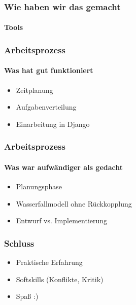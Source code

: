 \documentclass{beamer}
\begin{document}
\begin{frame}
\frametitle{Wie haben wir das gemacht}
\framesubtitle{Tools}

\end{frame}
\begin{frame}
\frametitle{Arbeitsprozess}
\framesubtitle{Was hat gut funktioniert}
\begin{itemize}
	\item<1-3> Zeitplanung
	\item<2-3> Aufgabenverteilung
	\item<3> Einarbeitung in Django
\end{itemize}
\end{frame}

\begin{frame}
\frametitle{Arbeitsprozess}
\framesubtitle{Was war aufwändiger als gedacht}
\begin{itemize}
	\item<1-3> Planungsphase
	\item<2-3> Wasserfallmodell ohne Rückkopplung
	\item<3> Entwurf vs. Implementierung
\end{itemize}
\end{frame}

\begin{frame}
\frametitle{Schluss}
	
\begin{center}
\begin{itemize}
	\item<1-3> Praktische Erfahrung
	\item<2-3> Softskills (Konflikte, Kritik)
	\item<3> Spaß :) 
\end{itemize}
\end{center}
	
\end{frame}

\end{document}
